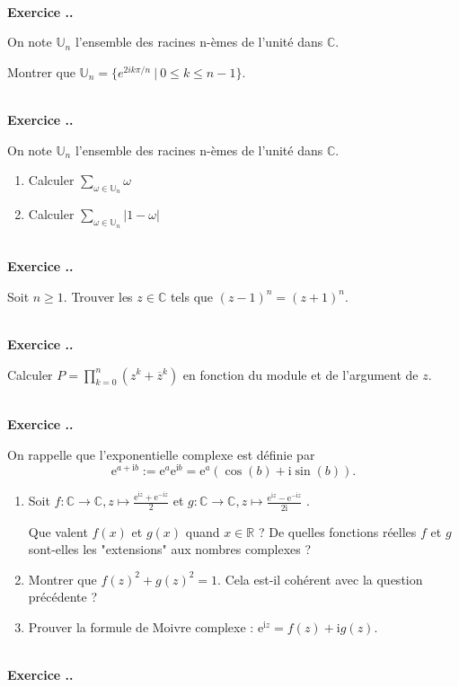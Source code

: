 \documentclass{article}
\newcommand{\mb}[1]{\mathbb{#1}}
\newcounter{exo}
\newcommand{\exercice}[1][\null]{\textbf{\\ \large Exercice \thesection.\theexo. \normalsize #1} \addtocounter{exo}{1}}
\begin{document}
\exercice 
On note $\mathbb{U}_n$ l'ensemble des racines n-èmes de l'unité dans
$\mathbb{C}$.

Montrer que $\mathbb{U}_n = \{ e^{2ik\pi / n} ~|~ 0 \leq k \leq n - 1 \}$.



\exercice

On note $\mathbb{U}_n$ l'ensemble des racines n-èmes de l'unité dans
$\mathbb{C}$.
\begin{enumerate}
    \item Calculer $\sum_{ \omega \in \mathbb{U}_n} \omega$
    \item Calculer $\sum_{ \omega \in \mathbb{U}_n} | 1 - \omega |$
\end{enumerate}




\exercice

Soit $n \ge 1$. Trouver les $z \in \mb{C}$ tels que $(z-1)^n = (z+1)^n$.


\exercice

Calculer $\displaystyle P = \prod_{k=0}^n(z^k + \overline{z}^{k})$ en fonction du module et de l'argument de $z$.




\exercice

On rappelle que l'exponentielle complexe est définie par $$\text{e}^{a+\text{i}b} := \text{e}^{a} \text{e}^{\text{i}b} = \text{e}^{a} (\cos(b) + \text{i} \sin(b)).$$

\begin{enumerate}


\item Soit $f: \mb{C} \rightarrow \mb{C}, z \mapsto \frac{\text{e}^{\text{i}z}+\text{e}^{-\text{i}z}}{2}$ et $g: \mb{C} \rightarrow \mb{C}, z \mapsto \frac{\text{e}^{\text{i}z}-\text{e}^{-\text{i}z}}{2\text{i}}$ .

Que valent $f(x)$ et $g(x)$ quand $x \in \mb{R}$ ? De quelles fonctions réelles $f$ et $g$ sont-elles les "extensions" aux nombres complexes ?

\item Montrer que $f(z)^2 + g(z)^2 = 1$. Cela est-il cohérent avec la question précédente ?

\item Prouver la formule de Moivre complexe : $\text{e}^{\text{i}z} = f(z) + \text{i} g(z)$.

\end{enumerate}




\exercice
\end{document}
